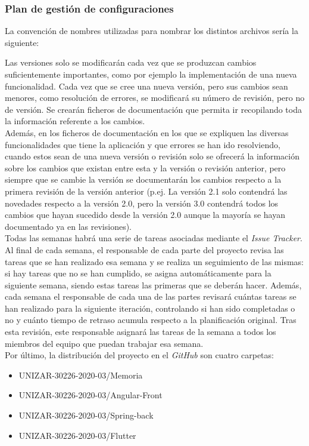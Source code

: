 \documentclass{article}
\begin{document}
\subsubsection{Plan de gestión de configuraciones}
La convención de nombres utilizadas para nombrar los distintos archivos sería la siguiente: 
\begin{figure}[H]
\end{figure}
Las versiones solo se modificarán cada vez que se produzcan cambios suficientemente importantes, como por ejemplo la implementación de una nueva funcionalidad. 
Cada vez que se cree una nueva versión, pero sus cambios sean menores, como resolución de errores, se modificará su número de revisión, pero no de versión. 
Se crearán ficheros de documentación que permita ir recopilando toda la información referente a los cambios.\\
\hfill \break
Además, en los ficheros de documentación en los que se expliquen las diversas funcionalidades que tiene la aplicación y que errores se han ido resolviendo, cuando estos sean de una nueva versión o revisión solo se ofrecerá la información sobre los cambios que existan entre esta y la versión o revisión anterior, pero siempre que se cambie la versión se documentarán los cambios respecto a la primera revisión de la versión anterior (p.ej. La versión 2.1 solo contendrá las novedades respecto a la versión 2.0, pero la versión 3.0 contendrá todos los cambios que hayan sucedido desde la versión 2.0 aunque la mayoría se hayan documentado ya en las revisiones).\\
\hfill \break
Todas las semanas habrá una serie de tareas asociadas mediante el \textit{Issue Tracker}. Al final de cada semana, el responsable de cada parte del proyecto revisa las tareas que se han realizado esa semana y se realiza un seguimiento de las mismas: si hay tareas que no se han cumplido, se asigna automáticamente para la siguiente semana, siendo estas tareas las primeras que se deberán hacer.  
\hfill \break
Además, cada semana el responsable de cada una de las partes revisará cuántas tareas se han realizado para la siguiente iteración, controlando si han sido completadas o no y cuánto tiempo de retraso acumula respecto a la planificación original.  Tras esta revisión, este responsable asignará las tareas de la semana a todos los miembros del equipo que puedan trabajar esa semana. \\
\hfill \break
Por último, la distribución del proyecto en el \textit{GitHub} son cuatro carpetas:
\begin{itemize}
	\item UNIZAR-30226-2020-03/Memoria
	\item UNIZAR-30226-2020-03/Angular-Front
	\item UNIZAR-30226-2020-03/Spring-back
	\item UNIZAR-30226-2020-03/Flutter
\end{itemize}
\end{document}
